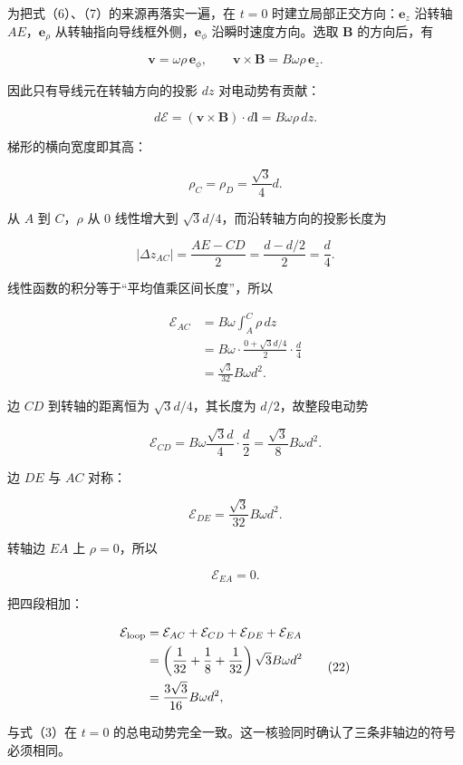 \documentclass[12pt,a4paper,UTF8]{ctexart}
\begin{document}
为把式（6）、（7）的来源再落实一遍，在 \(t=0\)
时建立局部正交方向：\(\bm e_z\) 沿转轴 \(AE\)，\(\bm e_\rho\)
从转轴指向导线框外侧，\(\bm e_\phi\) 沿瞬时速度方向。选取 \(\bm B\)
的方向后，有

\[
\bm v=\omega\rho\,\bm e_\phi,
\qquad
\bm v\times\bm B
=B\omega\rho\,\bm e_z.
\tag{14}
\]

因此只有导线元在转轴方向的投影 \(dz\) 对电动势有贡献：

\[
d\mathcal E=(\bm v\times\bm B)\cdot d\bm l
=B\omega\rho\,dz.
\tag{15}
\]

梯形的横向宽度即其高：

\[
\rho_C=\rho_D=\frac{\sqrt3}{4}d.
\tag{16}
\]

从 \(A\) 到 \(C\)，\(\rho\) 从 \(0\) 线性增大到
\(\sqrt3d/4\)，而沿转轴方向的投影长度为

\[
|\Delta z_{AC}|=\frac{AE-CD}{2}=\frac{d-d/2}{2}=\frac d4.
\tag{17}
\]

线性函数的积分等于``平均值乘区间长度''，所以

\[
\begin{aligned}
\mathcal E_{AC}
&=B\omega\int_A^C\rho\,dz\\
&=B\omega\cdot
\frac{0+\sqrt3d/4}{2}\cdot\frac d4\\
&=\frac{\sqrt3}{32}B\omega d^2.
\end{aligned}
\tag{18}
\]

边 \(CD\) 到转轴的距离恒为 \(\sqrt3d/4\)，其长度为 \(d/2\)，故整段电动势

\[
\mathcal E_{CD}
=B\omega\frac{\sqrt3d}{4}\cdot\frac d2
=\frac{\sqrt3}{8}B\omega d^2.
\tag{19}
\]

边 \(DE\) 与 \(AC\) 对称：

\[
\mathcal E_{DE}=\frac{\sqrt3}{32}B\omega d^2.
\tag{20}
\]

转轴边 \(EA\) 上 \(\rho=0\)，所以

\[
\mathcal E_{EA}=0.
\tag{21}
\]

把四段相加：

\[
\begin{aligned}
\mathcal E_{\rm loop}
&=\mathcal E_{AC}+\mathcal E_{CD}
+\mathcal E_{DE}+\mathcal E_{EA}\\
&=\left(\frac1{32}+\frac18+\frac1{32}\right)
\sqrt3B\omega d^2\\
&=\frac{3\sqrt3}{16}B\omega d^2,
\end{aligned}
\tag{22}
\]

与式（3）在 \(t=0\)
的总电动势完全一致。这一核验同时确认了三条非轴边的符号必须相同。
\end{document}
